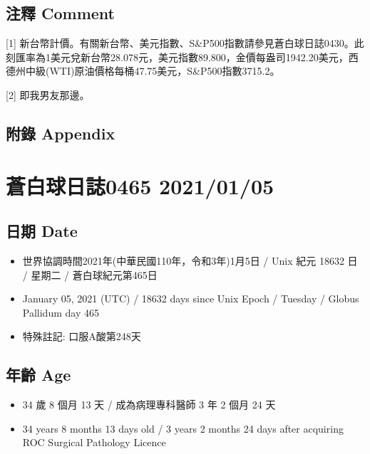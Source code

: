 \documentclass[
]{article}
\providecommand{\tightlist}{%
  \setlength{\itemsep}{0pt}\setlength{\parskip}{0pt}}
\begin{document}
\hypertarget{ux6ce8ux91cb-comment-3}{%
\subsection{注釋 Comment}\label{ux6ce8ux91cb-comment-3}}

{[}1{]}
新台幣計價。有關新台幣、美元指數、S\&P500指數請參見蒼白球日誌0430。此刻匯率為1美元兌新台幣28.078元，美元指數89.800，金價每盎司1942.20美元，西德州中級(WTI)原油價格每桶47.75美元，S\&P500指數3715.2。

{[}2{]} 即我男友那邊。

\hypertarget{ux9644ux9304-appendix-3}{%
\subsection{附錄 Appendix}\label{ux9644ux9304-appendix-3}}

\hypertarget{ux84bcux767dux7403ux65e5ux8a8c0465-20210105}{%
\section{蒼白球日誌0465
2021/01/05}\label{ux84bcux767dux7403ux65e5ux8a8c0465-20210105}}

\hypertarget{ux65e5ux671f-date-4}{%
\subsection{日期 Date}\label{ux65e5ux671f-date-4}}

\begin{itemize}
\tightlist
\item
  世界協調時間2021年(中華民國110年，令和3年)1月5日 / Unix 紀元 18632 日
  / 星期二 / 蒼白球紀元第465日
\item
  January 05, 2021 (UTC) / 18632 days since Unix Epoch / Tuesday /
  Globus Pallidum day 465
\item
  特殊註記: 口服A酸第248天
\end{itemize}

\hypertarget{ux5e74ux9f61-age-4}{%
\subsection{年齡 Age}\label{ux5e74ux9f61-age-4}}

\begin{itemize}
\tightlist
\item
  34 歲 8 個月 13 天 / 成為病理專科醫師 3 年 2 個月 24 天
\item
  34 years 8 months 13 days old / 3 years 2 months 24 days after
  acquiring ROC Surgical Pathology Licence
\end{itemize}
\end{document}
